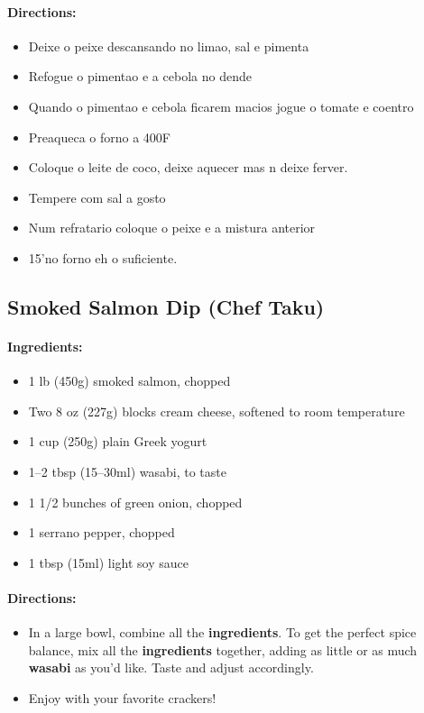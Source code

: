 \documentclass{article}
\begin{document}
\paragraph{Directions:}
\begin{itemize}
    \item Deixe o peixe descansando no limao, sal e pimenta
    \item Refogue o pimentao e a cebola no dende
    \item Quando o pimentao e cebola ficarem macios jogue o tomate e coentro
    \item Preaqueca o forno a 400F
    \item Coloque o leite de coco, deixe aquecer mas n deixe ferver.
    \item Tempere com sal a gosto
    \item Num refratario coloque o peixe e a mistura anterior
    \item 15'no forno eh o suficiente.
\end{itemize}

\subsection{Smoked Salmon Dip (Chef Taku)}

\paragraph{Ingredients:}
\begin{itemize}
    \item 1 lb (450g) smoked salmon, chopped
    \item Two 8 oz (227g) blocks cream cheese, softened to room temperature
    \item 1 cup (250g) plain Greek yogurt
    \item 1–2 tbsp (15–30ml) wasabi, to taste
    \item 1 1/2 bunches of green onion, chopped
    \item 1 serrano pepper, chopped
    \item 1 tbsp (15ml) light soy sauce
\end{itemize}

\paragraph{Directions:}
\begin{itemize}
    \item In a large bowl, combine all the \textbf{ingredients}. To get the perfect spice balance, mix all the \textbf{ingredients} together, adding as little or as much \textbf{wasabi} as you'd like. Taste and adjust accordingly.
    \item Enjoy with your favorite crackers!
\end{itemize}
\end{document}
